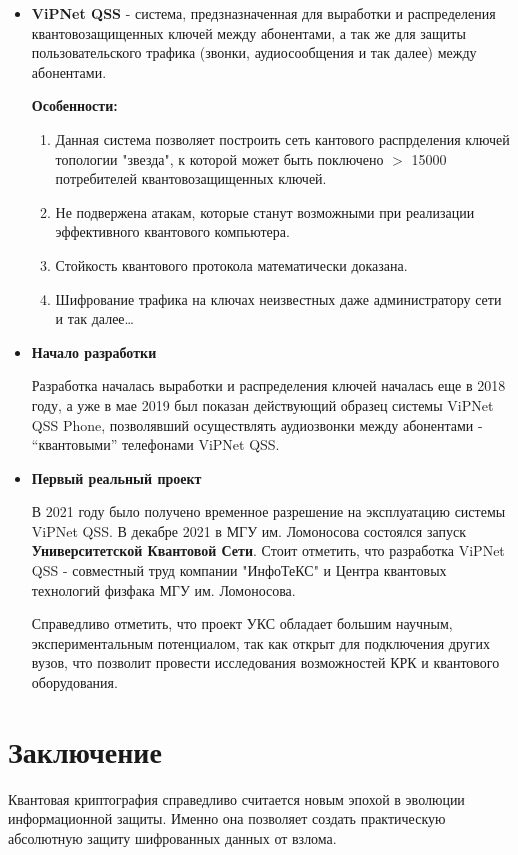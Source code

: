\begin{itemize}
    \item \textbf{ViPNet QSS} - система, предзназначенная для выработки и распределения квантовозащищенных ключей между абонентами, а так же для защиты пользовательского трафика (звонки, аудиосообщения и так далее) между абонентами. 

    \textbf{Особенности:}
    \begin{enumerate}
        \item Данная система позволяет построить сеть кантового распрделения ключей топологии "звезда", к которой может быть поключено $>$ 15000 потребителей квантовозащищенных ключей.
        \item Не подвержена атакам, которые станут возможными при реализации эффективного квантового компьютера.
        \item Стойкость квантового протокола математически доказана.
        \item Шифрование трафика на ключах неизвестных даже администратору сети и так далее\dots
    \end{enumerate}
    
    \item \textbf{Начало разработки}
    
    Разработка началась выработки и распределения ключей началась еще в 2018 году, а уже в мае 2019 был показан действующий образец системы ViPNet QSS Phone, позволявший осуществлять аудиозвонки между абонентами - ``квантовыми'' телефонами ViPNet QSS.
    \item \textbf{Первый реальный проект}
    
    В 2021 году было получено временное разрешение на эксплуатацию системы ViPNet QSS. В декабре 2021 в МГУ им. Ломоносова состоялся запуск \textbf{Университетской Квантовой Сети}. Стоит отметить, что разработка ViPNet QSS - совместный труд компании "ИнфоТеКС" и Центра квантовых технологий физфака МГУ им. Ломоносова. 
    
    Справедливо отметить, что проект УКС обладает большим научным, экспериментальным потенциалом, так как открыт для подключения других вузов, что позволит провести исследования возможностей КРК и квантового оборудования.    
\end{itemize}

\section{Заключение}

Квантовая криптография справедливо считается новым эпохой в эволюции информационной защиты. Именно она позволяет создать практическую абсолютную защиту шифрованных данных от взлома. 

